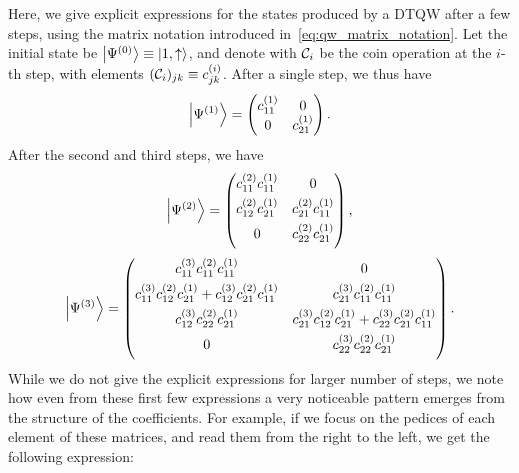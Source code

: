 \begin{example}[label={ex:qw_bimatrix_notation}]
    Here, we give explicit expressions for the states produced by a \ac{DTQW} after a few steps, using the matrix notation introduced in~\cref{eq:qw_matrix_notation}. Let the initial state be $\ket{\Psi^{(0)}}\equiv\ket{1,\uparrow}$, and denote with ${\mathcal{C}}_i$ be the coin operation at the $i$-th step, with elements $({\mathcal{C}}_i)_{jk}\equiv c^{(i)}_{jk}$.
    After a single step, we thus have
    \begin{equation}
        \ket{\Psi^{(1)}} =
        \begin{pmatrix}
            c^{(1)}_{11} & 0 \\
            0 & c^{(1)}_{21}
        \end{pmatrix}.
    \end{equation}
    After the second and third steps, we have
    \begin{equation}
        \ket{\Psi^{(2)}} =
        \begin{pmatrix}
            c^{(2)}_{11} c^{(1)}_{11} & 0 \\[0.4em]
            c^{(2)}_{12} c^{(1)}_{21} & c^{(2)}_{21} c^{(1)}_{11} \\[0.4em]
            0 & c^{(2)}_{22} c^{(1)}_{21} \\[0.4em]
        \end{pmatrix},
    \end{equation}
    \begin{equation}
        \ket{\Psi^{(3)}} =
        \begin{pmatrix}
            c^{(3)}_{11} c^{(2)}_{11} c^{(1)}_{11} & 0 \\[0.4em]
            c^{(3)}_{11} c^{(2)}_{12} c^{(1)}_{21} +
            c^{(3)}_{12} c^{(2)}_{21} c^{(1)}_{11} &
            c^{(3)}_{21} c^{(2)}_{11} c^{(1)}_{11} \\[0.4em]
            c^{(3)}_{12} c^{(2)}_{22} c^{(1)}_{21} &
            c^{(3)}_{21} c^{(2)}_{12} c^{(1)}_{21} +
            c^{(3)}_{22} c^{(2)}_{21} c^{(1)}_{11} \\[0.4em]
            0 & c^{(3)}_{22} c^{(2)}_{22} c^{(1)}_{21} \\[0.4em]
        \end{pmatrix}.
    \end{equation}
    While we do not give the explicit expressions for larger number of steps, we note how even from these first few expressions a very noticeable pattern emerges from the structure of the coefficients. For example, if we focus on the pedices of each element of these matrices, and read them from the right to the left, we get the following expression:

\end{example}
